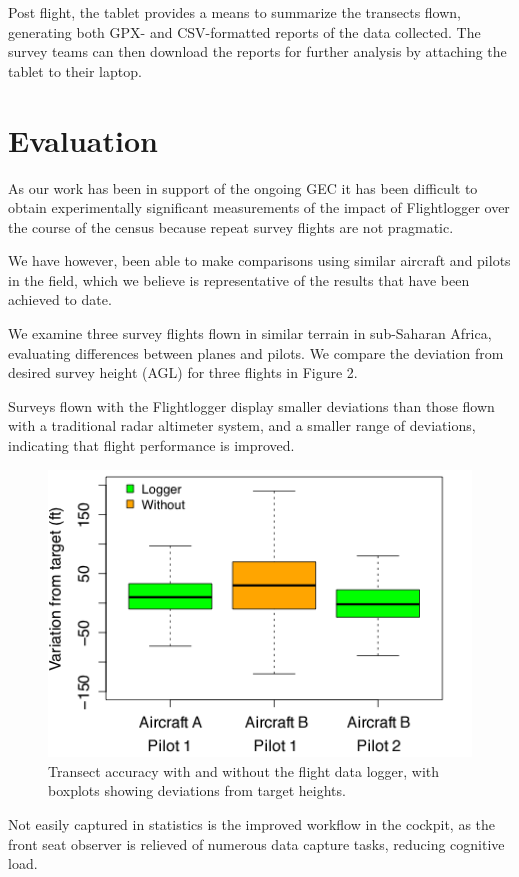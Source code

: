 \documentclass{sig-alternate-2013}
\begin{document}
Post flight, the tablet provides a means to summarize the transects flown, generating both GPX- and CSV-formatted reports of the data collected. The survey teams can then download the reports for further analysis by attaching the tablet to their laptop.

\section{Evaluation}
As our work has been in support of the ongoing GEC it has been difficult to obtain experimentally significant measurements of the impact of Flightlogger over the course of the census because repeat survey flights are not pragmatic. 

We have however, been able to make comparisons using similar aircraft and pilots in the field, which we believe is representative of the results that have been achieved to date.

We examine three survey flights flown in similar terrain in sub-Saharan Africa, evaluating differences between planes and pilots. We compare the deviation from desired survey height (AGL) for three flights in Figure 2.

Surveys flown with the Flightlogger display smaller deviations than those flown with a traditional radar altimeter system, and a smaller range of deviations, indicating that flight performance is improved.
\begin{figure}[h]
\centering
\includegraphics[width=0.9\columnwidth]{altplot13c}
\caption{Transect accuracy with and without the flight data logger, with boxplots showing deviations from target heights.}
\end{figure}

Not easily captured in statistics is the improved workflow in the cockpit, as the front seat observer is relieved of numerous data capture tasks, reducing cognitive load. 
\end{document}

